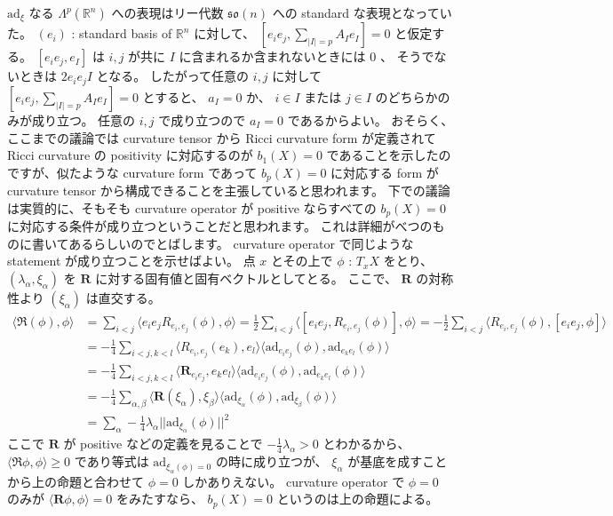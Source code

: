 \begin{Proof}
\itemprof
  \(\text{ad}_{\xi}\) なる \(\Lambda^p(\mathbb{R}^n)\) への表現はリー代数 \(\mathfrak{so}(n)\) への standard な表現となっていた。
  \((e_i)\) : standard basis of \(\mathbb{R}^n\) に対して、 \([e_i e_j , \sum_{|I| = p} A_I e_I] = 0\) と仮定する。 \([e_i e_j , e_I]\) は \(i,j\) が共に \(I\) に含まれるか含まれないときには \(0\) 、 そうでないときは \(2 e_i e_j I\) となる。
  したがって任意の \(i,j\) に対して \([e_i e_j , \sum_{|I| = p} A_I e_I] = 0\) とすると、 \(a_I = 0\) か、 \(i \in I\) または \(j \in I\) のどちらかのみが成り立つ。
  任意の \(i,j\) で成り立つので \(a_I = 0\) であるからよい。
\itemprof
  おそらく、ここまでの議論では curvature tensor から Ricci curvature form が定義されて Ricci curvature の positivity に対応するのが \(b_1(X) = 0\) であることを示したのですが、似たような curvature form であって \(b_p(X) = 0\) に対応する form が curvature tensor から構成できることを主張していると思われます。
  下での議論は実質的に、そもそも curvature operator が positive ならすべての \(b_p(X) = 0\) に対応する条件が成り立つということだと思われます。
  これは詳細がべつのものに書いてあるらしいのでとばします。
\itemprof
  curvature operator で同じような statement が成り立つことを示せばよい。
  点 \(x\) とその上で \(\phi\) : \(T_x X\) をとり、 \(\)
  \((\lambda_\alpha , \xi_\alpha)\) を \(\mathbf{R}\) に対する固有値と固有ベクトルとしてとる。
  ここで、 \(\mathbf{R}\) の対称性より \((\xi_\alpha)\) は直交する。
  \begin{align*}
    \langle \mathfrak{R} (\phi) , \phi \rangle
    &= \sum_{i < j} \langle e_i e_j R_{e_i , e_j} (\phi) , \phi \rangle
    = \frac{1}{2} \sum_{i < j} \langle [e_i e_j , R_{e_i , e_j}(\phi)] , \phi \rangle
    = -\frac{1}{2} \sum_{i < j} \langle R_{e_i , e_j}(\phi) , [e_i e_j , \phi] \rangle \\
    &= -\frac{1}{4} \sum_{i < j , k < l}
    \langle R_{e_i , e_j}(e_k) , e_l \rangle \langle \text{ad}_{e_i e_j}(\phi) , \text{ad}_{e_k e_l}(\phi) \rangle \\
    &= -\frac{1}{4} \sum_{i<j,k<l} \langle \mathbf{R}_{e_i e_j} , e_k e_l \rangle \langle \text{ad}_{e_i e_j} (\phi) , \text{ad}_{e_k e_l} (\phi) \rangle \\
    &= - \frac{1}{4} \sum_{\alpha , \beta} \langle \mathbf{R}(\xi_{\alpha}) , \xi_{\beta} \rangle \langle \text{ad}_{\xi_\alpha}(\phi) , \text{ad}_{\xi_\beta}(\phi) \rangle \\
    &= \sum_{\alpha} - \frac{1}{4}  \lambda_\alpha || \text{ad}_{\xi_\alpha}(\phi) ||^2
  \end{align*}
  ここで \(\mathbf{R}\) が positive などの定義を見ることで \(- \frac{1}{4}  \lambda_\alpha > 0\) とわかるから、 \(\langle \mathfrak{R} \phi , \phi \rangle \geq 0\) であり等式は \(\text{ad}_{\xi_{\alpha}(\phi) = 0}\) の時に成り立つが、 \(\xi_\alpha\) が基底を成すことから上の命題と合わせて \(\phi = 0\) しかありえない。
  curvature operator で \(\phi = 0\) のみが \(\langle \mathbf{R} \phi , \phi \rangle = 0\) をみたすなら、 \(b_p(X) = 0\) というのは上の命題による。
\end{Proof}

